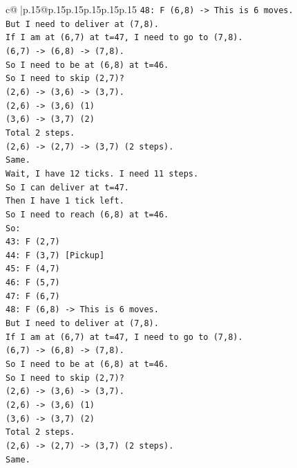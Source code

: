 \documentclass{article}
\begin{document}
{\begin{supertabular}{c@{$\;$}|p{.15\linewidth}@{}p{.15\linewidth}p{.15\linewidth}p{.15\linewidth}p{.15\linewidth}p{.15\linewidth}}
{{{\texttt{48: F (6,8) {-}> This is 6 moves.} \\
\texttt{But I need to deliver at (7,8).} \\
\texttt{If I am at (6,7) at t=47, I need to go to (7,8).} \\
\texttt{(6,7) {-}> (6,8) {-}> (7,8).} \\
\texttt{So I need to be at (6,8) at t=46.} \\
\texttt{So I need to skip (2,7)?} \\
\texttt{(2,6) {-}> (3,6) {-}> (3,7).} \\
\texttt{(2,6) {-}> (3,6) (1)} \\
\texttt{(3,6) {-}> (3,7) (2)} \\
\texttt{Total 2 steps.} \\
\texttt{(2,6) {-}> (2,7) {-}> (3,7) (2 steps).} \\
\texttt{Same.} \\
\texttt{Wait, I have 12 ticks. I need 11 steps.} \\
\texttt{So I can deliver at t=47.} \\
\texttt{Then I have 1 tick left.} \\
\texttt{So I need to reach (6,8) at t=46.} \\
\texttt{So:} \\
\texttt{43: F (2,7)} \\
\texttt{44: F (3,7) {[}Pickup{]}} \\
\texttt{45: F (4,7)} \\
\texttt{46: F (5,7)} \\
\texttt{47: F (6,7)} \\
\texttt{48: F (6,8) {-}> This is 6 moves.} \\
\texttt{But I need to deliver at (7,8).} \\
\texttt{If I am at (6,7) at t=47, I need to go to (7,8).} \\
\texttt{(6,7) {-}> (6,8) {-}> (7,8).} \\
\texttt{So I need to be at (6,8) at t=46.} \\
\texttt{So I need to skip (2,7)?} \\
\texttt{(2,6) {-}> (3,6) {-}> (3,7).} \\
\texttt{(2,6) {-}> (3,6) (1)} \\
\texttt{(3,6) {-}> (3,7) (2)} \\
\texttt{Total 2 steps.} \\
\texttt{(2,6) {-}> (2,7) {-}> (3,7) (2 steps).} \\
\texttt{Same.} \\
}}}
\end{supertabular}}
\end{document}
